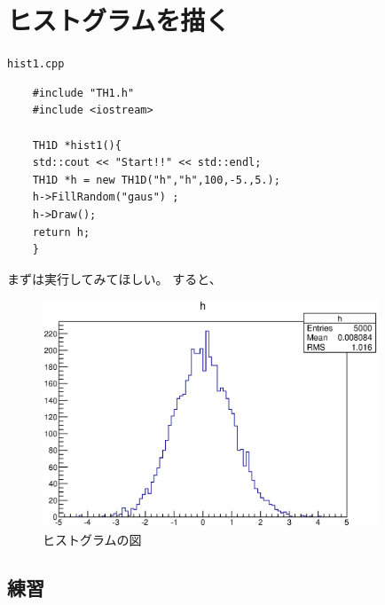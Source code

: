 \documentclass{jarticle}
\begin{document}
 \section{ヒストグラムを描く}

 \begin{itembox}{\texttt{hist1.cpp}}
\begin{verbatim}
	#include "TH1.h"
	#include <iostream>

	TH1D *hist1(){
	std::cout << "Start!!" << std::endl;
	TH1D *h = new TH1D("h","h",100,-5.,5.);
	h->FillRandom("gaus") ;
	h->Draw();
	return h;
	}
\end{verbatim}
 \end{itembox}

 まずは実行してみてほしい。
 すると、
 \begin{figure}[htbp]
  \begin{center}
   \includegraphics[width = 100mm]{./picture/hist1canvas1.eps}
  \end{center}
  \caption{ヒストグラムの図}
  \label{Fig:hist1canvas1}
 \end{figure}

  \subsection{練習}
\end{document}
